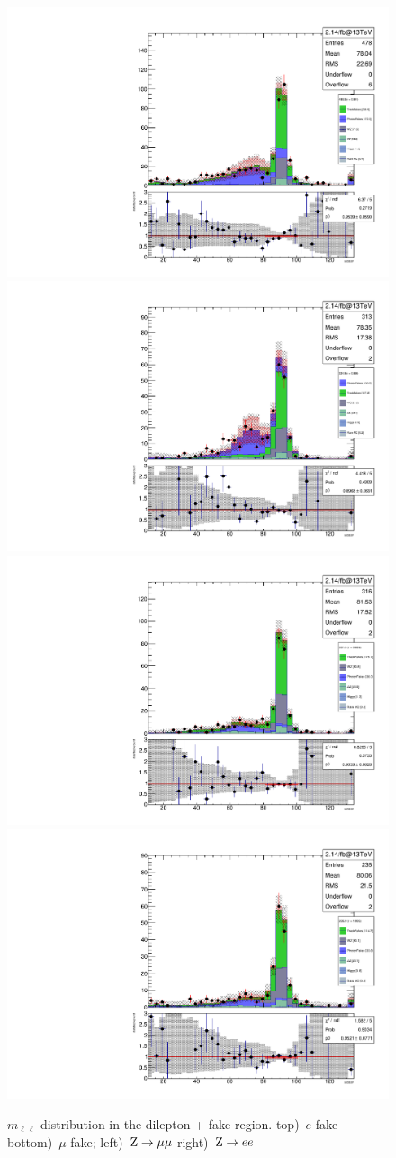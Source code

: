 \begin{figure}
\begin{center}
	\includegraphics[width=.5\textwidth]{Background/bkg_fakeLight/Z_1el2mu_MOSSF}%
	\includegraphics[width=.5\textwidth]{Background/bkg_fakeLight/Z_3el_MOSSF}\\
	\includegraphics[width=.5\textwidth]{Background/bkg_fakeLight/Z_3mu_MOSSF}%
	\includegraphics[width=.5\textwidth]{Background/bkg_fakeLight/Z_2el1mu_MOSSF}\\
	\caption{$m_{\ell\ell}$ distribution in the dilepton + fake region. \enskip top)~$e$ fake \enskip bottom)~$\mu$ fake; \enskip left)~$\mathrm{Z} \to \mu\mu$ \enskip right)~$\mathrm{Z} \to e e$
	\label{fig:fakeLight_Z_MOSSF_byFlavor}}
\end{center}
\end{figure}

